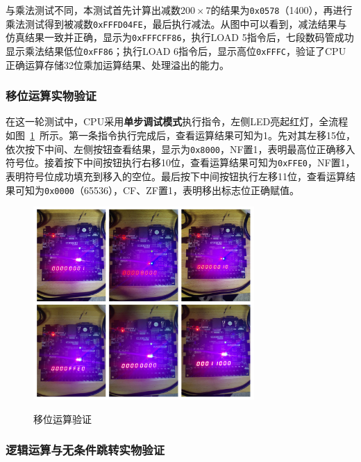 \documentclass[lang=cn,a4paper,newtx]{elegantpaper}
\begin{document}
与乘法测试不同，本测试首先计算出减数$200\times7$的结果为\texttt{0x0578}（1400），再进行乘法测试得到被减数\texttt{0xFFFD04FE}，最后执行减法。从图中可以看到，减法结果与仿真结果一致并正确，显示为\texttt{0xFFFCFF86}，执行LOAD 5指令后，七段数码管成功显示乘法结果低位\texttt{0xFF86}；执行LOAD 6指令后，显示高位\texttt{0xFFFC}，验证了CPU正确运算存储32位乘加运算结果、处理溢出的能力。
\subsubsection{移位运算实物验证}

在这一轮测试中，CPU采用\textbf{单步调试模式}执行指令，左侧LED亮起红灯，全流程如图~\ref{fig:FPGA_shift}~所示。第一条指令执行完成后，查看运算结果可知为1。先对其左移15位，依次按下中间、左侧按钮查看结果，显示为\texttt{0x8000}，NF置1，表明最高位正确移入符号位。接着按下中间按钮执行右移10位，查看运算结果可知为\texttt{0xFFE0}，NF置1，表明符号位成功填充到移入的空位。最后按下中间按钮执行左移11位，查看运算结果可知为\texttt{0x0000}（65536），CF、ZF置1，表明移出标志位正确赋值。
\begin{figure}[htbp]
  \centering
  \caption{移位运算验证}
  \includegraphics[width = 0.75\textwidth]{figure/shift_verification.pdf}
  \label{fig:FPGA_shift}
\end{figure}

\subsubsection{逻辑运算与无条件跳转实物验证}
\end{document}
